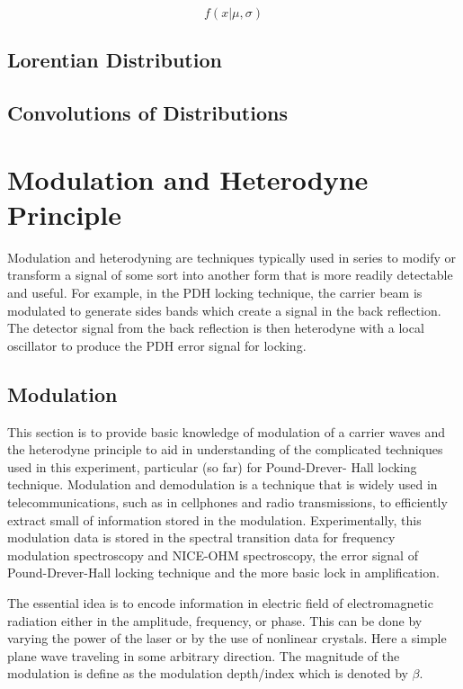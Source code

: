 \documentclass[a4paper]{book}
\begin{document}
		\begin{equation}
			f(x|\mu,\sigma)
		\end{equation}
		
		\subsection{Lorentian Distribution}
			\label{ssec:LorentianDistribution}
		
		\subsection{Convolutions of Distributions}
			\label{ssec:convolution}

	\section{Modulation and Heterodyne Principle}
		Modulation and heterodyning are techniques typically used in series to modify or transform a signal of some sort into another form that is more readily detectable and useful. For example, in the PDH locking technique, the carrier beam is modulated to generate sides bands which create a signal in the back reflection. The detector signal from the back reflection is then heterodyne with a local oscillator to produce the PDH error signal for locking.

		\subsection{Modulation}
			\label{ssec:Modulation}
			This section is to provide basic knowledge of modulation of a carrier waves and the heterodyne principle to aid in understanding of the complicated techniques used in this experiment, particular (so far) for Pound-Drever- Hall locking technique. Modulation and demodulation is a technique that is widely used in telecommunications, such as in cellphones and radio transmissions, to efficiently extract small of information stored in the modulation. Experimentally, this modulation data is stored in the spectral transition data for frequency modulation spectroscopy and NICE-OHM spectroscopy, the error signal of Pound-Drever-Hall locking technique and the more basic lock in amplification.
			
			The essential idea is to encode information in electric field of electromagnetic radiation either in the amplitude, frequency, or phase. This can be done by varying the power of the laser or by the use of nonlinear crystals. Here a simple plane wave traveling in some arbitrary direction. The magnitude of the modulation is define as the modulation depth/index which is denoted by $\beta$.
			
\end{document}
